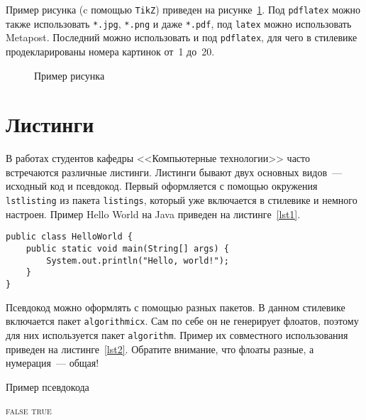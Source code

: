 \documentclass[annotation,times,page4]{itmo-student-thesis}
\begin{document}
Пример рисунка (c помощью \texttt{TikZ}) приведен на рисунке~\ref{fig1}. Под \texttt{pdflatex} можно также
использовать \texttt{*.jpg}, \texttt{*.png} и даже \texttt{*.pdf}, под \texttt{latex} можно использовать
Metapost. Последний можно использовать и под \texttt{pdflatex}, для чего в стилевике продекларированы
номера картинок от~1 до~20.

\begin{figure}[!h]
\caption{Пример рисунка}\label{fig1}
\centering
{}
\end{figure}

\section{Листинги}

В работах студентов кафедры <<Компьютерные технологии>> часто встречаются различные листинги. Листинги бывают
двух основных видов~--- исходный код и псевдокод. Первый оформляется с помощью окружения \texttt{lstlisting}
из пакета \texttt{listings}, который уже включается в стилевике и немного настроен. Пример Hello World на Java
приведен на листинге~\ref{lst1}.

\begin{lstlisting}[float=!h,caption={Пример исходного кода на Java},label={lst1}]
public class HelloWorld {
	public static void main(String[] args) {
		System.out.println("Hello, world!");
	}
}
\end{lstlisting}

Псевдокод можно оформлять с помощью разных пакетов. В данном стилевике включается пакет \texttt{algorithmicx}.
Сам по себе он не генерирует флоатов, поэтому для них используется пакет \texttt{algorithm}.
Пример их совместного использования приведен на листинге~\ref{lst2}. Обратите внимание, что флоаты разные, а 
нумерация~--- общая!

\begin{algorithm}[!h]
\caption{Пример псевдокода}\label{lst2}
\begin{algorithmic}
				\State\Return \textsc{false}
			\EndIf
		\EndFor
		\State\Return \textsc{true}
	\EndFunction
\end{algorithmic}
\end{algorithm}
\end{document}
